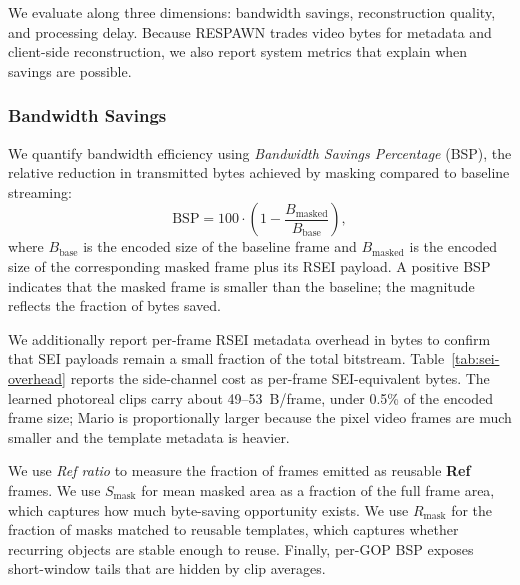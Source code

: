 We evaluate \sysname along three dimensions: bandwidth savings, reconstruction quality, and processing delay.
Because RESPAWN trades video bytes for metadata and client-side reconstruction, we also report system metrics that explain when savings are possible.

\subsubsection{Bandwidth Savings}
\label{sec:metricBandwidth}

We quantify bandwidth efficiency using \emph{Bandwidth Savings Percentage} (BSP), the relative reduction in transmitted bytes achieved by masking compared to baseline streaming:
\[
  \mathrm{BSP} = 100 \cdot
  \left(1 - \frac{B_{\mathrm{masked}}}{B_{\mathrm{base}}}\right),
\]
where $B_{\mathrm{base}}$ is the encoded size of the baseline frame and $B_{\mathrm{masked}}$ is the encoded size of the corresponding masked frame plus its RSEI payload.
A positive BSP indicates that the masked frame is smaller than the baseline; the magnitude reflects the fraction of bytes saved.

We additionally report per-frame RSEI metadata overhead in bytes to confirm that SEI payloads remain a small fraction of the total bitstream.
Table~\ref{tab:sei-overhead} reports the side-channel cost as per-frame SEI-equivalent bytes.
The learned photoreal clips carry about 49--53~B/frame, under 0.5\% of the encoded frame size; Mario is proportionally larger because the pixel video frames are much smaller and the template metadata is heavier.

\begin{table}[t]
  \centering
  \small
  \caption{Per-frame SEI-equivalent side-channel overhead on the CRF23 intake. Frame sizes are mean encoded frame sizes; ``pure'' is the matched no-masking reference.}
  \label{tab:sei-overhead}
  \setlength{\tabcolsep}{4pt}
  
\end{table}

We use \emph{Ref ratio} to measure the fraction of frames emitted as reusable \textbf{Ref} frames.
We use $S_{\mathrm{mask}}$ for mean masked area as a fraction of the full frame area, which captures how much byte-saving opportunity exists.
We use $R_{\mathrm{mask}}$ for the fraction of masks matched to reusable templates, which captures whether recurring objects are stable enough to reuse.
Finally, per-GOP BSP exposes short-window tails that are hidden by clip averages.

